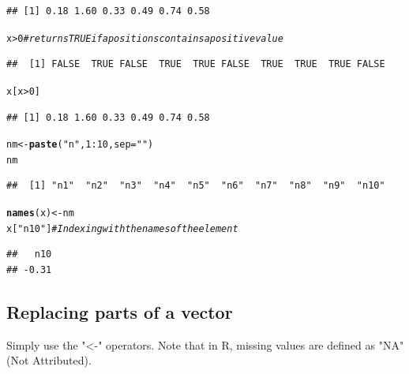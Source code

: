 \documentclass[10pt]{article}\usepackage[]{graphicx}\usepackage[]{color}
\makeatletter
\newcommand{\hlnum}[1]{\textcolor[rgb]{0.686,0.059,0.569}{#1}}%
\newcommand{\hlstr}[1]{\textcolor[rgb]{0.192,0.494,0.8}{#1}}%
\newcommand{\hlcom}[1]{\textcolor[rgb]{0.678,0.584,0.686}{\textit{#1}}}%
\newcommand{\hlopt}[1]{\textcolor[rgb]{0,0,0}{#1}}%
\newcommand{\hlstd}[1]{\textcolor[rgb]{0.345,0.345,0.345}{#1}}%
\newcommand{\hlkwb}[1]{\textcolor[rgb]{0.69,0.353,0.396}{#1}}%
\newcommand{\hlkwc}[1]{\textcolor[rgb]{0.333,0.667,0.333}{#1}}%
\newcommand{\hlkwd}[1]{\textcolor[rgb]{0.737,0.353,0.396}{\textbf{#1}}}%
\newenvironment{kframe}{%
 \def\at@end@of@kframe{}%
 \ifinner\ifhmode%
  \def\at@end@of@kframe{\end{minipage}}%
  \begin{minipage}{\columnwidth}%
 \fi\fi%
 \def\FrameCommand##1{\hskip\@totalleftmargin \hskip-\fboxsep
 \colorbox{shadecolor}{##1}\hskip-\fboxsep
     \hskip-\linewidth \hskip-\@totalleftmargin \hskip\columnwidth}%
 \MakeFramed {\advance\hsize-\width
   \@totalleftmargin\z@ \linewidth\hsize
   \@setminipage}}%
 {\par\unskip\endMakeFramed%
 \at@end@of@kframe}
\newenvironment{knitrout}{}{} %
\makeatother
\begin{document}
\begin{knitrout}
\begin{kframe}
\begin{alltt}
\end{alltt}
\begin{verbatim}
## [1] 0.18 1.60 0.33 0.49 0.74 0.58
\end{verbatim}
\begin{alltt}
\hlstd{x} \hlopt{>} \hlnum{0}            \hlcom{# returns TRUE if a positions contains a positive value}
\end{alltt}
\begin{verbatim}
##  [1] FALSE  TRUE FALSE  TRUE  TRUE FALSE  TRUE  TRUE  TRUE FALSE
\end{verbatim}
\begin{alltt}
\hlstd{x[x} \hlopt{>} \hlnum{0}\hlstd{]}
\end{alltt}
\begin{verbatim}
## [1] 0.18 1.60 0.33 0.49 0.74 0.58
\end{verbatim}
\begin{alltt}
\hlstd{nm} \hlkwb{<-} \hlkwd{paste}\hlstd{(}\hlstr{"n"}\hlstd{,}\hlnum{1}\hlopt{:}\hlnum{10}\hlstd{,} \hlkwc{sep}\hlstd{=}\hlstr{""}\hlstd{)}
\hlstd{nm}
\end{alltt}
\begin{verbatim}
##  [1] "n1"  "n2"  "n3"  "n4"  "n5"  "n6"  "n7"  "n8"  "n9"  "n10"
\end{verbatim}
\begin{alltt}
\hlkwd{names}\hlstd{(x)} \hlkwb{<-} \hlstd{nm}
\hlstd{x[}\hlstr{"n10"}\hlstd{]}          \hlcom{# Indexing with the names of the element}
\end{alltt}
\begin{verbatim}
##   n10 
## -0.31
\end{verbatim}
\end{kframe}
\end{knitrout}
\medskip



\subsection{Replacing parts of a vector}
Simply use the "<-" operators. Note that in R, missing values are defined as "NA" (Not Attributed).
\end{document}

